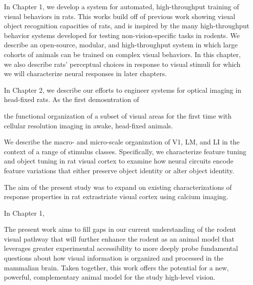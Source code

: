 In Chapter 1, we develop a system for automated, high-throughput training of visual behaviors in rats. This works build off of previous work showing visual object recognition capacities of rats, and is inspired by the many high-throughput behavior systems developed for testing non-vision-specific tasks in rodents. We describe an open-source, modular, and high-throughput system in which large cohorts of animals can be trained on complex visual behaviors. In this chapter, we also describe rats' perceptual choices in response to visual stimuli for which we will characterize neural responses in later chapters.

In Chapter 2, we describe our efforts to engineer systems for optical imaging in head-fixed rats. As the first demosntration of 

the functional organization of a subset of visual areas for the first time with cellular resolution imaging in awake, head-fixed animals. 

We describe the macro- and micro-scale organization of V1, LM, and LI in the context of a range of stimulus classes. Specifically, we characterize feature tuning and object tuning in rat visual cortex to examine how neural circuits encode feature variations that either preserve object identity or alter object identity. 

The aim of the present study was to expand on existing characterizations of response properties in rat extrastriate visual cortex using calcium imaging.


In Chapter 1, 



The present work aims to fill gaps in our current understanding of the rodent visual pathway that will further enhance the rodent as an animal model that leverages greater experimental accessibility to more deeply probe fundamental questions about how visual information is organized and processed in the mammalian brain. Taken together, this work offers the potential for a new, powerful, complementary animal model for the study high-level vision.




